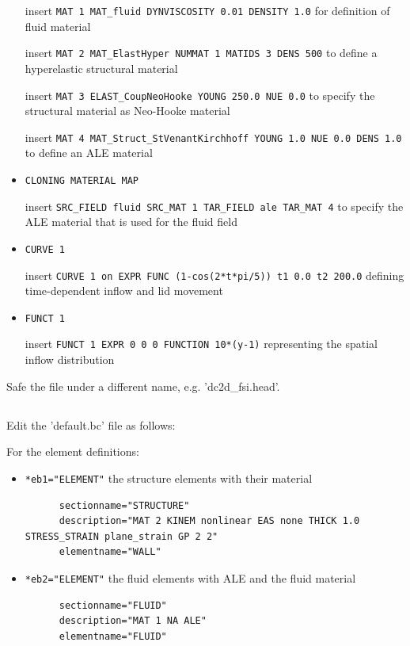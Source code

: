 \begin{itemize}
 insert \verb|MAT 1 MAT_fluid DYNVISCOSITY 0.01 DENSITY 1.0| for definition of
 fluid material
 
 insert \verb|MAT 2 MAT_ElastHyper NUMMAT 1 MATIDS 3 DENS 500| to define a
 hyperelastic structural material

 insert \verb|MAT 3 ELAST_CoupNeoHooke YOUNG 250.0 NUE 0.0| to specify the
 structural material as Neo-Hooke material
 
 insert \verb|MAT 4 MAT_Struct_StVenantKirchhoff YOUNG 1.0 NUE 0.0 DENS 1.0| to
 define an ALE material

 \item \verb|CLONING MATERIAL MAP|

 insert \verb|SRC_FIELD fluid SRC_MAT 1 TAR_FIELD ale TAR_MAT 4| to specify the
 ALE material that is used for the fluid field 

 \item \verb|CURVE 1|

 insert \verb|CURVE 1 on EXPR FUNC (1-cos(2*t*pi/5)) t1 0.0 t2 200.0| defining
time-dependent inflow and lid movement
 
  \item \verb|FUNCT 1|

 insert \verb|FUNCT 1 EXPR 0 0 0 FUNCTION 10*(y-1)| representing the spatial
 inflow distribution

\end{itemize}
Safe the file under a different name, e.g. 'dc2d\_fsi.head'.

\subsection{\bc}
Edit the 'default.bc' file as follows:

For the element definitions:

\begin{itemize}
  \item \verb|*eb1="ELEMENT"| \qquad the structure elements with their material
  \begin{small} \begin{verbatim}
      sectionname="STRUCTURE"
      description="MAT 2 KINEM nonlinear EAS none THICK 1.0 STRESS_STRAIN plane_strain GP 2 2"
      elementname="WALL"
    \end{verbatim} 
  \end{small}
 
 \item \verb|*eb2="ELEMENT"| \qquad the fluid elements with ALE and the
 fluid material
 \begin{small} \begin{verbatim}
      sectionname="FLUID"
      description="MAT 1 NA ALE"
      elementname="FLUID"
    \end{verbatim} 
  \end{small}
\end{itemize}

